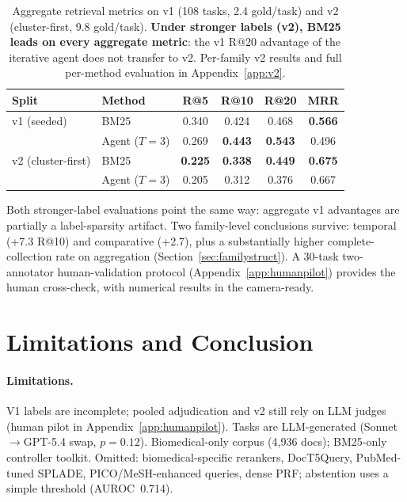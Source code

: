\documentclass{article}
\begin{document}
\begin{table}[t]
\centering
\caption{Aggregate retrieval metrics on v1 (108 tasks, 2.4 gold/task) and v2 (cluster-first, 9.8 gold/task). \textbf{Under stronger labels (v2), BM25 leads on every aggregate metric}: the v1 R@20 advantage of the iterative agent does not transfer to v2. Per-family v2 results and full per-method evaluation in Appendix~\ref{app:v2}.}
\label{tab:v2main}
\small
\begin{tabular}{llcccc}
\toprule
\textbf{Split} & \textbf{Method} & \textbf{R@5} & \textbf{R@10} & \textbf{R@20} & \textbf{MRR} \\
\midrule
v1 (seeded)        & BM25            & 0.340 & 0.424 & 0.468 & \textbf{0.566} \\
                   & Agent ($T{=}3$) & 0.269 & \textbf{0.443} & \textbf{0.543} & 0.496 \\
v2 (cluster-first) & BM25            & \textbf{0.225} & \textbf{0.338} & \textbf{0.449} & \textbf{0.675} \\
                   & Agent ($T{=}3$) & 0.205 & 0.312 & 0.376 & 0.667 \\
\bottomrule
\end{tabular}
\end{table}

Both stronger-label evaluations point the same way: aggregate v1 advantages are partially a label-sparsity artifact. Two family-level conclusions survive: temporal (+7.3 R@10) and comparative (+2.7), plus a substantially higher complete-collection rate on aggregation (Section~\ref{sec:familystruct}). A 30-task two-annotator human-validation protocol (Appendix~\ref{app:humanpilot}) provides the human cross-check, with numerical results in the camera-ready.

\section{Limitations and Conclusion}
\label{sec:limitations}

\paragraph{Limitations.} V1 labels are incomplete; pooled adjudication and v2 still rely on LLM judges (human pilot in Appendix~\ref{app:humanpilot}). Tasks are LLM-generated (Sonnet$\to$GPT-5.4 swap, $p{=}0.12$). Biomedical-only corpus (4{,}936 docs); BM25-only controller toolkit. Omitted: biomedical-specific rerankers, DocT5Query, PubMed-tuned SPLADE, PICO/MeSH-enhanced queries, dense PRF; abstention uses a simple threshold (AUROC~0.714).
\end{document}
